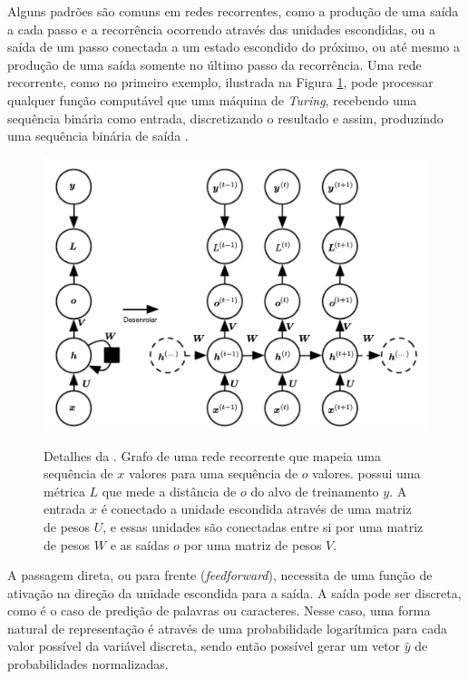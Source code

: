 Alguns padrões são comuns em redes recorrentes, como a produção de uma saída a cada passo e a recorrência ocorrendo através das unidades escondidas, ou a saída de um passo conectada a um estado escondido do próximo, ou até mesmo a produção de uma saída somente no último passo da recorrência. Uma rede recorrente, como no primeiro exemplo, ilustrada na Figura \ref{fig:rnn-turing}, pode processar qualquer função computável que uma máquina de \textit{Turing}, recebendo uma sequência binária como entrada, discretizando o resultado e assim, produzindo uma sequência binária de saída \cite{Goodfellow2016DeepLearning}.
\begin{figure}[htbp]
    \centering
        \caption[Detalhes da .]{Detalhes da . Grafo de uma rede recorrente que mapeia uma sequência de $x$ valores para uma sequência de $o$ valores. possui uma métrica $L$ que mede a distância de $o$ do alvo de treinamento $y$. A entrada $x$ é conectado a unidade escondida através de uma matriz de pesos $U$, e essas unidades são conectadas entre si por uma matriz de pesos $W$ e as saídas $o$ por uma matriz de pesos $V$.}
        \includegraphics[scale=0.60]{resources/images/pln/rnn-turing.png}
        \label{fig:rnn-turing}
\end{figure}

A passagem direta, ou para frente (\textit{feedforward}), necessita de uma função de ativação na direção da unidade escondida para a saída. A saída pode ser discreta, como é o caso de predição de palavras ou caracteres. Nesse caso, uma forma natural de representação é através de uma probabilidade logarítmica para cada valor possível da variável discreta, sendo então possível gerar um vetor $\hat{y}$ de probabilidades normalizadas.

